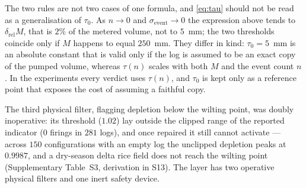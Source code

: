 The two rules are not two cases of one formula, and \eqref{eq:tau} should not be
read as a generalisation of $\tau_0$. As $n\to0$ and
$\sigma_{\mathrm{event}}\to0$ the expression above tends to
$\delta_{\mathrm{rel}}M$, that is $2\%$ of the metered volume, not to $5$~mm; the two
thresholds coincide only if $M$ happens to equal $250$~mm. They differ in kind:
$\tau_0=5$~mm is an absolute constant that is valid only if the log is assumed to
be an exact copy of the pumped volume, whereas $\tau(n)$ scales with both $M$ and
the event count $n$. In the experiments every verdict uses $\tau(n)$, and
$\tau_0$ is kept only as a reference point that exposes the cost of assuming a
faithful copy.

\begin{remark}
\label{sec:v2reach}
The third physical filter, flagging depletion below the wilting point, was doubly inoperative: its threshold ($1.02$) lay outside the clipped range of the reported indicator ($0$ firings in $281$ logs), and once repaired it still cannot activate --- across $150$ configurations with an empty log the unclipped depletion peaks at $0.9987$, and a dry-season delta rice field does not reach the wilting point (Supplementary Table~S3, derivation in
S13). The layer has two operative physical filters and one inert safety device.
\end{remark}
